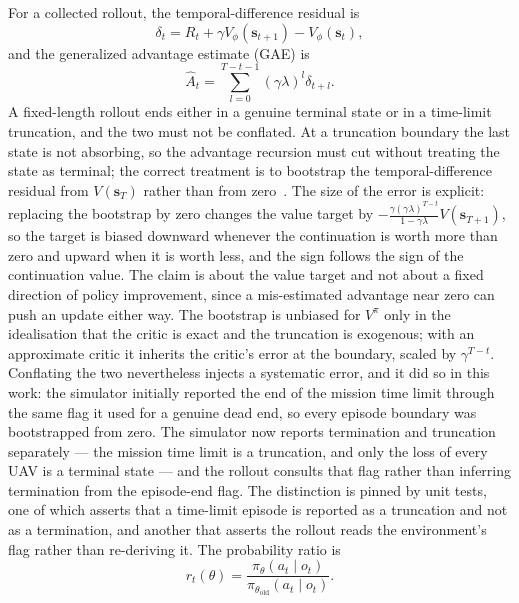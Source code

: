 \documentclass[conference]{IEEEtran}
\begin{document}
For a collected rollout, the temporal-difference residual is
\begin{equation}
\delta_t=R_t+\gamma V_{\phi}(\mathbf s_{t+1})-V_{\phi}(\mathbf s_t),
\label{eq:tdres}
\end{equation}
and the generalized advantage estimate (GAE) is
\begin{equation}
\widehat A_t=\sum_{l=0}^{T-t-1}(\gamma\lambda)^l\delta_{t+l}.
\label{eq:gae}
\end{equation}
A fixed-length rollout ends either in a genuine terminal state or in a time-limit truncation, and the two must not be conflated. At a truncation boundary the last state is not absorbing, so the advantage recursion must cut without treating the state as terminal; the correct treatment is to bootstrap the temporal-difference residual from $V(\mathbf s_{T})$ rather than from zero~\cite{pardo2018}. The size of the error is explicit: replacing the bootstrap by zero changes the value target by $-\frac{\gamma(\gamma\lambda)^{T-t}}{1-\gamma\lambda}V(\mathbf s_{T+1})$, so the target is biased downward whenever the continuation is worth more than zero and upward when it is worth less, and the sign follows the sign of the continuation value. The claim is about the value target and not about a fixed direction of policy improvement, since a mis-estimated advantage near zero can push an update either way. The bootstrap is unbiased for $V^\pi$ only in the idealisation that the critic is exact and the truncation is exogenous; with an approximate critic it inherits the critic's error at the boundary, scaled by $\gamma^{T-t}$. Conflating the two nevertheless injects a systematic error, and it did so in this work: the simulator initially reported the end of the mission time limit through the same flag it used for a genuine dead end, so every episode boundary was bootstrapped from zero. The simulator now reports termination and truncation separately --- the mission time limit is a truncation, and only the loss of every UAV is a terminal state --- and the rollout consults that flag rather than inferring termination from the episode-end flag. The distinction is pinned by unit tests, one of which asserts that a time-limit episode is reported as a truncation and not as a termination, and another that asserts the rollout reads the environment's flag rather than re-deriving it.
The probability ratio is
\begin{equation}
r_t(\theta)=\frac{\pi_\theta(a_t\mid o_t)}{\pi_{\theta_{\mathrm{old}}}(a_t\mid o_t)}.
\end{equation}
\end{document}
